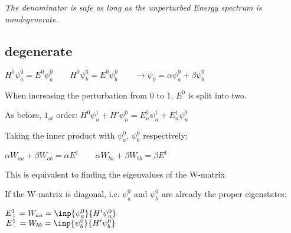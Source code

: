 \documentclass[10pt,a4paper]{scrartcl}
\begin{document}
\begin{multicols*}{3}
	\begin{center}$\qquad$\end{center}
	
	
	\emph{The denominator is safe as long as the unperturbed Energy spectrum is nondegenerate.}
	
	\subsection{degenerate}
	
	$H^0\psi_a^0=E^0\psi_a^0\qquad H^0\psi_b^0=E^0\psi_b^0\qquad\rightarrow \psi_0=\alpha\psi_a^0+\beta\psi_b^0$
	
	When increasing the perturbation from 0 to 1, $E^0$ is split into two.
	
	As before, $1_{st}$ order: $H^0\psi_n^1+H'\psi_n^0=E_n^0\psi_n^1+E_n^1\psi_n^0$
	
	Taking the inner product with $\psi_a^0$, $\psi_b^0$ respectively:
	
	$\alpha W_{aa}+\beta W_{ab}=\alpha E^1\qquad \alpha W_{ba}+\beta W_{bb}=\beta E^1$
	
	
	
	This is equivalent to finding the eigenvalues of the W-matrix
	
	
	
	If the W-matrix is diagonal, i.e. $\psi_a^0$ and $\psi_b^0$ are already the proper eigenstates:
	
	$\begin{matrix}E_+^1=W_{aa}=\inp{\psi_a^0}{H'\psi_a^0}\\E_-^1=W_{bb}=\inp{\psi_b^0}{H'\psi_b^0}\end{matrix}$
	

\end{multicols*}
\end{document}
